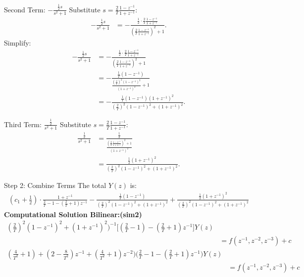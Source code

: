 \documentclass[journal]{IEEEtran}
\begin{document}
	Second Term: $ -\frac{\frac{1}{2}s}{s^2 + 1} $
	Substitute $s = \frac{2}{T} \frac{1 - z^{-1}}{1 + z^{-1}}$:
	\begin{align}
		-\frac{\frac{1}{2}s}{s^2 + 1} &= -\frac{\frac{1}{2} \cdot \frac{2}{T} \frac{1 - z^{-1}}{1 + z^{-1}}}{\left(\frac{2}{T} \frac{1 - z^{-1}}{1 + z^{-1}}\right)^2 + 1}.
	\end{align}
	Simplify:
	\begin{align}
		-\frac{\frac{1}{2}s}{s^2 + 1} &= -\frac{\frac{1}{2} \cdot \frac{2}{T} \frac{1 - z^{-1}}{1 + z^{-1}}}{\left(\frac{2}{T} \frac{1 - z^{-1}}{1 + z^{-1}}\right)^2 + 1} \\
		&= -\frac{\frac{1}{T} (1 - z^{-1})}{\frac{\left(\frac{2}{T}\right)^2 (1 - z^{-1})^2}{(1 + z^{-1})^2} + 1} \\
		&= -\frac{\frac{1}{T} (1 - z^{-1})(1 + z^{-1})^2}{\left(\frac{2}{T}\right)^2 (1 - z^{-1})^2 + (1 + z^{-1})^2}.
	\end{align}
	
	Third Term: $ \frac{\frac{1}{2}}{s^2 + 1} $
	Substitute $s = \frac{2}{T} \frac{1 - z^{-1}}{1 + z^{-1}}$:
	\begin{align}
		\frac{\frac{1}{2}}{s^2 + 1} &= \frac{\frac{1}{2}}{\frac{\left(\frac{2}{T} \frac{1 - z^{-1}}{1 + z^{-1}}\right)^2 + 1}{(1 + z^{-1})^2}} \\
		&= \frac{\frac{1}{2} (1 + z^{-1})^2}{\left(\frac{2}{T}\right)^2 (1 - z^{-1})^2 + (1 + z^{-1})^2}.
	\end{align}
	
	Step 2: Combine Terms
	The total $Y(z)$ is:
	\begin{align}
		(c_1 + \frac{1}{2}) \cdot \frac{1 + z^{-1}}{\frac{2}{T} - 1 - \left(\frac{2}{T} + 1\right)z^{-1}} 
		- \frac{\frac{1}{T} (1 - z^{-1})}{\left(\frac{2}{T}\right)^2 (1 - z^{-1})^2 + (1 + z^{-1})^2} 
		+ \frac{\frac{1}{2} (1 + z^{-1})^2}{\left(\frac{2}{T}\right)^2 (1 - z^{-1})^2 + (1 + z^{-1})^2}
	\end{align}
	\textbf{Computational Solution Bilinear:(sim2)}
	\begin{align}
		\left(\frac{2}{T}\right)^2 \left(1 - z^{-1}\right)^2 + \left(1 + z^{-1}\right)^2
		\Bigg)^{-1} 
		\Bigg[
		\left(\frac{2}{T} - 1\right) - \left(\frac{2}{T} + 1\right)z^{-1} 
		\Bigg] Y(z) \nonumber \\
		&= f(z^{-1}, z^{-2}, z^{-3}) + c
	\end{align}
	\begin{align}
		\left(\frac{4}{T^2} + 1\right) + \left(2 - \frac{8}{T^2}\right)z^{-1} + \left(\frac{4}{T^2} + 1\right)z^{-2} 
		\Bigg) \Bigg(\frac{2}{T} - 1 - \left(\frac{2}{T} + 1\right)z^{-1}\Bigg) Y(z) \nonumber \\
		&= f(z^{-1}, z^{-2}, z^{-3}) + c
	\end{align}
	
\end{document}
